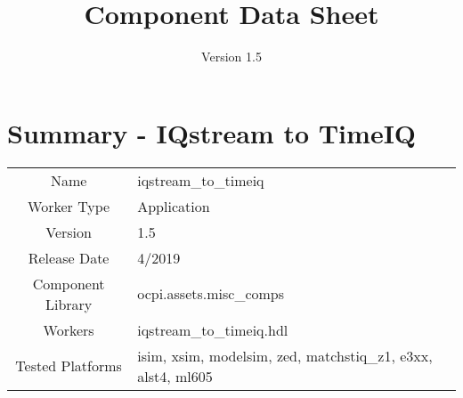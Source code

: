 \iffalse
This file is protected by Copyright. Please refer to the COPYRIGHT file
distributed with this source distribution.

This file is part of OpenCPI <http://www.opencpi.org>

OpenCPI is free software: you can redistribute it and/or modify it under the
terms of the GNU Lesser General Public License as published by the Free Software
Foundation, either version 3 of the License, or (at your option) any later
version.

OpenCPI is distributed in the hope that it will be useful, but WITHOUT ANY
WARRANTY; without even the implied warranty of MERCHANTABILITY or FITNESS FOR A
PARTICULAR PURPOSE. See the GNU Lesser General Public License for more details.

You should have received a copy of the GNU Lesser General Public License along
with this program. If not, see <http://www.gnu.org/licenses/>.
\fi

\def\docTitle{Component Data Sheet}
\def\docVersion{1.5}

\date{Version \docVersion} %
\title{\docTitle}
\lhead{\small{\docTitle}}

\usepackage{longtable} %

\def\comp{iqstream\_to\_timeiq}
\def\ecomp{iqstream_to_timeiq}
\def\Comp{IQstream to TimeIQ}
\graphicspath{ {figures/} }



\section*{Summary - \Comp}
\begin{tabular}{|c|M{13.5cm}|}
	\hline
	                  &                        							\\
	\hline
	Name              & \comp                  							\\
	\hline
	Worker Type       & Application            							\\
	\hline
	Version           & \docVersion                  							\\
	\hline
	Release Date      & 4/2019           						\\
	\hline
	Component Library & ocpi.assets.misc\_comps 					\\
	\hline
	Workers           & \comp.hdl              							\\
	\hline
	Tested Platforms  & isim, xsim, modelsim, zed, matchstiq\_z1, e3xx, alst4, ml605	\\
	\hline
\end{tabular}
	
